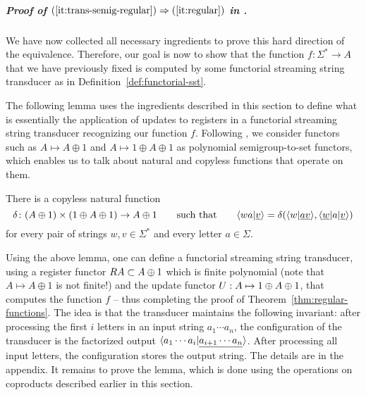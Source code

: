 \subparagraph*{Proof of $(\ref{it:trans-semig-regular}) \Rightarrow (\ref{it:regular})$ in .}
We have now collected all necessary ingredients to prove this hard direction of the equivalence. Therefore, our goal is now to show that the function $f\colon \Sigma^* \to A$ that we have previously fixed is computed by some functorial streaming string transducer as in Definition~\ref{def:functorial-sst}.

The following lemma uses the ingredients described in this section to define what is essentially the application of updates to registers in a functorial streaming string transducer recognizing our function $f$. Following , we consider functors such as $A \mapsto A \oplus 1$ and $A\mapsto 1 \oplus A \oplus 1$ as polynomial semigroup-to-set functors, which enables us to talk about natural and copyless functions that operate on them.
\begin{lemma}\label{lem:compute-next-configuration}
    There is a {copyless} natural function
    \[
    \delta\colon (A \oplus 1) \times (1 \oplus A \oplus 1) \to A \oplus 1
    \qquad\text{such that}\qquad
    \langle wa|\underline v \rangle = \delta(\langle w|\underline {av} \rangle,\langle \underline w | a|\underline v \rangle)
    \]
    for every pair of strings $w,v \in \Sigma^*$ and every letter $a \in \Sigma$.
    \end{lemma}
    Using the above lemma, one can define a functorial streaming string transducer, using a register functor $\functorr A \subset A \oplus 1$ which is finite polynomial (note that $A \mapsto A \oplus 1$ is not finite!) and the update functor $\functoru : A \mapsto 1 \oplus A \oplus 1$, that computes the function $f$ -- thus completing the proof of Theorem~\ref{thm:regular-functions}. The idea is that the transducer maintains the following invariant: after processing the first $i$ letters in an input string $a_1 \cdots a_n$, the configuration of the transducer is the factorized output $\langle a_1 \cdots a_i | \underline{a_{i+1} \cdots a_n} \rangle$. After processing all input letters, the configuration stores the output string. The details are in the appendix. It remains to prove the lemma, which is done using the operations on coproducts described earlier in this section. 

